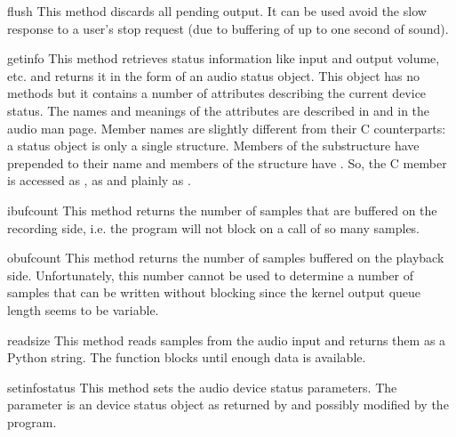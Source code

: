 \begin{funcdesc}{flush}{}
This method discards all pending output. It can be used avoid the
slow response to a user's stop request (due to buffering of up to one
second of sound).
\end{funcdesc}

\begin{funcdesc}{getinfo}{}
This method retrieves status information like input and output volume,
etc. and returns it in the form of
an audio status object. This object has no methods but it contains a
number of attributes describing the current device status. The names
and meanings of the attributes are described in
 and in the audio man page. Member names
are slightly different from their C counterparts: a status object is
only a single structure. Members of the  substructure have
 prepended to their name and members of the 
structure have . So, the C member  is
accessed as ,  as 
and  plainly as .
\end{funcdesc}

\begin{funcdesc}{ibufcount}{}
This method returns the number of samples that are buffered on the
recording side, i.e.
the program will not block on a  call of so many samples.
\end{funcdesc}

\begin{funcdesc}{obufcount}{}
This method returns the number of samples buffered on the playback
side. Unfortunately, this number cannot be used to determine a number
of samples that can be written without blocking since the kernel
output queue length seems to be variable.
\end{funcdesc}

\begin{funcdesc}{read}{size}
This method reads  samples from the audio input and returns
them as a Python string. The function blocks until enough data is available.
\end{funcdesc}

\begin{funcdesc}{setinfo}{status}
This method sets the audio device status parameters. The 
parameter is an device status object as returned by  and
possibly modified by the program.
\end{funcdesc}

